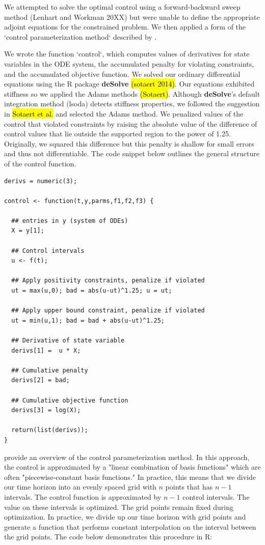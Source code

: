 \documentclass[12pt, oneside]{article}   	%
\begin{document}
We attempted to solve the optimal control using a forward-backward sweep method (Lenhart and Workman 20XX) but were unable to define the appropriate adjoint equations for the constrained problem. We then applied a form of the `control parameterization method` described by \cite{lin2014}.

We wrote the function `control`, which computes values of derivatives for state variables in the ODE system, the accumulated penalty for violating constraints, and the accumulated objective function. We solved our ordinary differential equations using the R package \textbf{deSolve} \hl{(sotaert 2014)}. Our equations exhibited stiffness so we applied the Adams methods \hl{(Sotaert)}. Although \textbf{deSolve}'s default integration method (lsoda) detects stiffness properties, we followed the suggestion in \hl{Sotaert et al.} and selected the Adams method. We penalized values of the control that violated constraints by raising the absolute value of the difference of control values that lie outside the supported region to the power of 1.25. Originally, we squared this difference but this penalty is shallow for small errors and thus not differentiable. The code snippet below outlines the general structure of the control function.

\begin{lstlisting}
derivs = numeric(3);

control <- function(t,y,parms,f1,f2,f3) {
  
  ## entries in y (system of ODEs)
  X = y[1];
  
  ## Control intervals
  u <- f(t);
  
  ## Apply positivity constraints, penalize if violated
  ut = max(u,0); bad = abs(u-ut)^1.25; u = ut;
  
  ## Apply upper bound constraint, penalize if violated
  ut = min(u,1); bad = bad + abs(u-ut)^1.25; 
  
  ## Derivative of state variable
  derivs[1] =  u * X;
  
  ## Cumulative penalty
  derivs[2] = bad;
  
  ## Cumulative objective function
  derivs[3] = log(X);
  
  return(list(derivs));
}

\end{lstlisting}


\cite{lin2014} provide an overview of the control parameterization method. In this approach, the control is approximated by a "linear combination of basis functions" which are often "piecewise-constant basis functions." In practice, this means that we divide our time horizon into an evenly spaced grid with $n$ points that has $n-1$ intervals. The control function is approximated by $n-1$ control intervals. The value on these intervals is optimized. The grid points remain fixed during optimization. In practice, we divide up our time horizon with grid points and generate a function that performs constant interpolation on the interval between the grid points. The code below demonstrates this procedure in R:
\end{document}
